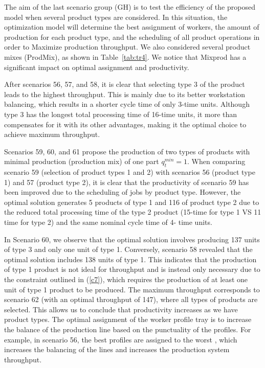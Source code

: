 \documentclass[review,12pt, 3p, times]{elsarticle}
\begin{document}
					

				
The aim of the last scenario group (GH) is to test the efficiency of the proposed model when several product types are considered. In this situation, the optimization model will determine the best assignment of workers,  the amount of production for each product type, and the scheduling of all product operations in order to Maximize production throughput. We also considered several product mixes (ProdMix), as shown in Table~\ref{tab:tr4}. We notice that Mixprod has a significant impact on optimal assignment and productivity. 
			
After  scenarios 56, 57, and 58, it is clear that selecting type 3 of the product leads to the highest throughput. This is mainly due to its better workstation balancing, which results in a shorter cycle time of only 3-time units. Although type 3 has the longest total processing time of 16-time units, it more than compensates for it with its other advantages, making it the optimal choice to achieve maximum throughput.  
		
Scenarios 59, 60, and 61 propose the production of two types of products with minimal production (production mix) of one part $q_t^{min}= 1$. When comparing scenario 59 (selection of product types 1 and 2) with scenarios 56 (product type 1) and 57 (product type 2), it is clear that the productivity of scenario 59 has been improved due to the scheduling of jobs by product type. However, the optimal solution generates 5 products of type 1 and 116 of product type 2 due to the reduced total processing time of the type 2 product (15-time  for type 1 VS 11 time  for type 2) and the same nominal cycle time of 4- time units. 
			
			
In Scenario 60, we observe that the optimal solution involves producing 137 units of type 3 and only one unit of type 1. Conversely, scenario 58 revealed that the optimal solution includes 138 units of type 1. This indicates that the production of type 1 product is not ideal for  throughput and is instead only necessary due to the constraint outlined in (\ref{c7}), which requires the production of at least one unit of type 1 product to be produced.
The maximum throughput corresponds to scenario 62 (with an optimal throughput of 147), where all types of products are selected. This allows us to conclude that productivity increases as we have  product types. 
The optimal assignment of the worker profile tray is to increase the balance of the production line based on the punctuality of the profiles. For example, in scenario 56, the best profiles are assigned to the worst , which increases the balancing of the lines and increases the production system throughput. 
	
\end{document}
